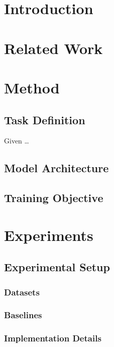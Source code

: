 \documentclass[anonymous,submit,techtabs]{acl}
\begin{document}
\maketitle

\begin{abstract}
\end{abstract}

\section{Introduction}

\section{Related Work}

\section{Method}

\subsection{Task Definition}
Given \dots

\subsection{Model Architecture}

\subsection{Training Objective}

\section{Experiments}

\subsection{Experimental Setup}
\subsubsection{Datasets}
\subsubsection{Baselines}
\subsubsection{Implementation Details}
\end{document}
